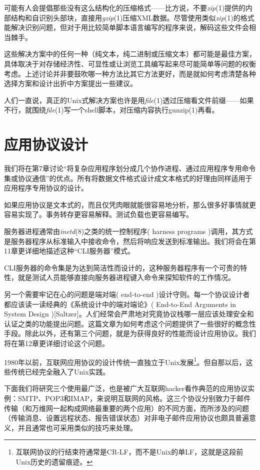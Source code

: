 \documentclass[12pt,oneside]{book}
\begin{document}
\begin{common-format}
可能有人会提倡那些没有这么结构化的压缩格式——比方说，不要\textit{zip}(1)提供的内部结构和自识别头部块，直接用\textit{gzip}(1)压缩XML数据。尽管使用类似\textit{zip}(1)的格式能解决识别问题，但对于用比较简单脚本语言编写的程序来说，解码这些文件会相当棘手。

这些解决方案中的任何一种（纯文本，纯二进制或压缩文本）都可能是最佳方案，具体取决于对存储经济性、可显性或让浏览工具编写起来尽可能简单等问题的权衡考虑。上述讨论并非要鼓吹哪一种方法比其它方法更好，而是就如何考虑清楚各种选择方案和设计出折中方案提出一些建议。

人们一直说，真正的Unix式解决方案也许是用\textit{file}(1)透过压缩看文件前缀——如果不行，就围绕\textit{file}(1)写一个shell脚本，对压缩内容执行gunzip(1)再看。


\section{应用协议设计}
我们将在第7章讨论“将复杂应用程序划分成几个协作进程、通过应用程序专用命令集或协议通信”的优点。所有将数据文件格式设计成文本格式的好理由同样适用于应用程序专用协议的设计。

如果应用协议是文本式的，而且仅凭肉眼就能很容易地分析，那么很多好事情就更容易实现了。事务转存更容易解释。测试负载也更容易编写。

服务器进程通常由\textit{inetd}(8)之类的统一控制程序( harness programs )调用，其方式是服务器程序从标准输入中接收命令，然后将响应发送到标准输出。我们将会在第11章更详细地描述这种“CLI服务器”模式。

CLI服务器的命令集是为达到简洁性而设计的，这种服务器程序有一个可贵的特性，就是测试人员能够直接向服务器进程键入命令来探知软件的工作情况。

另一个需要牢记在心的问题是端对端( end-to-end )设计守则。每一个协议设计者都应该读一读经典的《系统设计中的端对端论》( End-to-End Arguments in System Design )[Saltzer]。人们经常会严肃地对究竟协议栈哪一层应该处理安全和认证之类的功能提出问题。这篇文章为如何考虑这个问题提供了一些很好的概念性手段。除此以外，还有第三个问题，就是为获得良好的性能而设计应用协议。我们将在第12章更详细讨论这个问题。

1980年以前，互联网应用协议的设计传统一直独立于Unix发展\footnote{互联网协议的行结束符通常是CR-LF，而不是Unix的单LF，这就是这段前Unix历史的遗留痕迹。}。但自那以后，这些传统已经完全融入了Unix实践。

下面我们将研究三个使用最广泛，也是被广大互联网hacker看作典范的应用协议实例：SMTP、POP3和IMAP，来说明互联网的风格。这三个协议分别致力于邮件传输（和万维网一起构成网络最重要的两个应用）的不同方面，而所涉及的问题（传输消息、设置远程状态、报告错误状态）对非电子邮件应用协议也颇具普遍意义，并且通常也可采用类似的技巧来处理。




\end{common-format}
\end{document}
